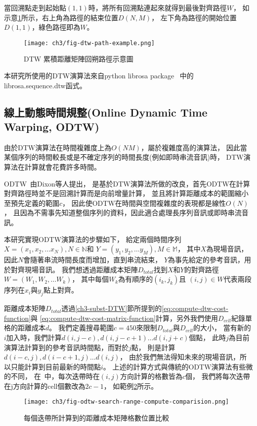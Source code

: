 \documentclass[class=NCU_thesis, crop=false]{standalone}
\begin{document}
當回溯點走到起始點$(1, 1)$時，將所有回溯點連起來就得到最後對齊路徑$W$，
如示意\cref{fig:fig-ch3-dtw-path-example}所示，右上角為路徑的結束位置$D(N, M)$，
左下角為路徑的開始位置$D(1, 1)$，綠色路徑即為$W$。
\begin{figure}[!hbt]
    \centering
    \texttt{[image: ch3/fig-dtw-path-example.png]}
    \caption{DTW 累積距離矩陣回朔路徑示意圖}
    \label{fig:fig-ch3-dtw-path-example}
\end{figure}

本研究所使用的DTW演算法來自python librosa package~\cite{McFee2024librosa}
中的librosa.sequence.dtw函式。

\subsection{線上動態時間規整(Online Dynamic Time Warping, ODTW)} \label{ch3-subst-ODTW}
由於DTW演算法在時間複雜度上為$O(NM)$，屬於複雜度高的演算法，
因此當某個序列的時間較長或是不確定序列的時間長度(例如即時串流音訊)時，
DTW演算法在計算就會花費許多時間。

ODTW~\cite{dixon2005ODTW}由Dixon等人提出，
是基於DTW演算法所做的改良，首先ODTW在計算對齊路徑時並不是回溯計算而是向前增量計算，
並且將計算距離成本的範圍縮小至預先定義的範圍$c$，
因此使ODTW在時間與空間複雜度的表現都是線性$O(N)$，
且因為不需事先知道整個序列的資料，因此適合處理長序列音訊或即時串流音訊。

本研究實現ODTW演算法的步驟如下，
給定兩個時間序列
$X = (x_1, x_2, \dots x_N), N \in \mathbb{N}$和
$Y = (y_1, y_2, \dots y_M), M \in \mathbb{M}$，
其中$X$為現場音訊，因此$N$會隨著串流時間長度而增加，直到串流結束，
$Y$為事先給定的參考音訊，用於對齊現場音訊。
我們想透過距離成本矩陣$D_{total}$找到$X$和$Y$的對齊路徑$W = (W_1, W_2, \dots W_k)$，
其中每個$W_k$為有順序的$(i_k,j_k)$且
$(i,j) \in W$代表兩段序列在$x_i$與$y_j$點上對齊。

距離成本矩陣$D_{total}$透過\ref{ch3-subst-DTW}節所提到的\cref{eq:compute-dtw-cost-function}與
\cref{eq:compute-dtw-cost-matrix-function}計算，另外我們使用$D_{cell}$紀錄單格的距離成本$d$。
我們定義搜尋範圍$c=450$來限制$D_{total}$與$D_{cell}$的大小，
當有新的$i$加入時，我們計算$d(i, j-c), d(i, j-c+1) \dots d(i, j+c)$個點，
此時$j$為目前演算法計算到的參考音訊時間點，而對於$j$點，
則是計算$d(i-c, j), d(i-c+1, j) \dots d(i, j)$，
由於我們無法得知未來的現場音訊，所以只能計算到目前最新的時間點$i$。
上述的計算方式與傳統的ODTW演算法有些微的不同，
在~\cite{dixon2005ODTW}中，每次迭帶時在$(i, j)$方向計算的格數皆為$c$個，
我們將每次迭帶在j方向計算的cell個數改為$2c-1$，
如範例\cref{fig:fig-ch3-odtw-search-range-compute-comparision}所示。
\begin{figure}[H]
    \centering
    \texttt{[image: ch3/fig-odtw-search-range-compute-comparision.png]}
    \caption{每個迭帶所計算到的距離成本矩陣格數位置比較}
    \label{fig:fig-ch3-odtw-search-range-compute-comparision}
\end{figure}
\end{document}
